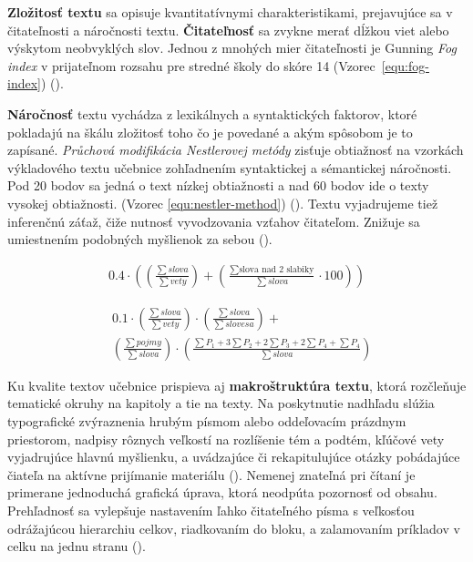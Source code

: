 \textbf{Zložitosť textu} sa opisuje kvantitatívnymi charakteristikami, prejavujúce sa v čitateľnosti a náročnosti textu. \textbf{Čitateľnosť} sa zvykne merať dĺžkou viet alebo výskytom neobvyklých slov. Jednou z mnohých mier čitateľnosti je Gunning \emph{Fog index} v prijateľnom rozsahu pre stredné školy do skóre 14 (Vzorec~\ref{equ:fog-index}) (\cite{drahosova_hodnotenie_2014}). 

\textbf{Náročnosť} textu vychádza z lexikálnych a syntaktických faktorov, ktoré pokladajú na škálu zložitosť toho čo je povedané a akým spôsobom je to zapísané. \emph{Průchová modifikácia Nestlerovej metódy} zisťuje obtiažnosť na vzorkách výkladového textu učebnice zohľadnením syntaktickej a sémantickej náročnosti. Pod 20 bodov sa jedná o text nízkej obtiažnosti a nad 60 bodov ide o texty vysokej obtiažnosti. (Vzorec \ref{equ:nestler-method}) (\cite{drahosova_hodnotenie_2014}). Textu vyjadrujeme tiež inferenčnú záťaž, čiže nutnosť vyvodzovania vzťahov čitateľom. Znižuje sa umiestnením podobných myšlienok za sebou (\cite{pavlovkin_ziak_1989}).

\begin{ceqn}\begin{align}
0.4 \cdot \left(\left(\frac{\sum slova}{\sum vety}\right) + 
\left(\frac{\sum \text{slova nad 2 slabiky}}{\sum slova}\cdot 100\right)\right)
\label{equ:fog-index}
\end{align}\end{ceqn}

\begin{equation}\begin{split}
& 0.1 \cdot \left(\frac{\sum slova}{\sum vety}\right) \cdot  \left(\frac{\sum slova}{\sum slovesa}\right) + \\
& \left(\frac{\sum pojmy}{\sum slova}\right) \cdot \left(\frac{\sum P_1 + 3\sum P_2 + 2\sum P_3 + 2\sum P_4 + \sum P_4}{\sum slova}\right)
\label{equ:nestler-method}
\end{split}\end{equation}

Ku kvalite textov učebnice prispieva aj \textbf{makroštruktúra textu}, ktorá rozčleňuje tematické okruhy na kapitoly a tie na texty. Na poskytnutie nadhľadu slúžia typografické zvýraznenia hrubým písmom alebo oddeľovacím prázdnym priestorom, nadpisy rôznych veľkostí na rozlíšenie tém a podtém, kľúčové vety vyjadrujúce hlavnú myšlienku, a uvádzajúce či rekapitulujúce otázky pobádajúce čiateľa na aktívne prijímanie materiálu (\cite{pavlovkin_ziak_1989}). Nemenej znateľná pri čítaní je primerane jednoduchá grafická úprava, ktorá neodpúta pozornosť od obsahu. Prehľadnosť sa vylepšuje nastavením ľahko čitateľného písma s veľkosťou odrážajúcou hierarchiu celkov, riadkovaním do bloku, a zalamovaním príkladov v celku na jednu stranu (\cite{mlady_tvorba_1988}).

